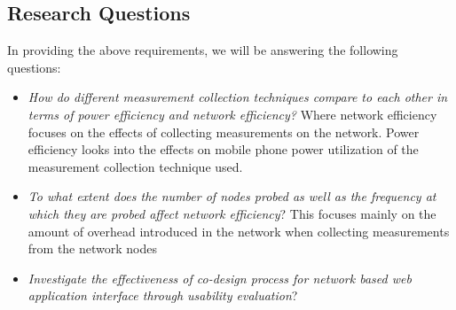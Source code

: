 \subsection{Research Questions}
In providing the above requirements, we will be answering the following questions:
\begin{itemize} %
	\item \textit{How do different measurement collection techniques compare to each other in terms of power efficiency and network efficiency?} Where network efficiency focuses on the effects of collecting measurements on the network. Power efficiency looks into the effects on mobile phone power utilization of the measurement collection technique used.
	\item \textit{To what extent does the number of nodes probed as well as the frequency at which they are probed affect network efficiency}? This focuses mainly on the amount of overhead introduced in the network when collecting measurements from the network nodes 
	\item  \textit{Investigate the effectiveness of co-design process for network based web application interface through usability evaluation}? %
	
\end{itemize}
